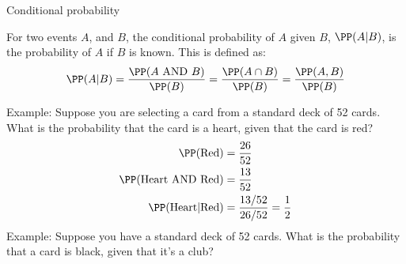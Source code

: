 \documentclass[compress, 8pt]{beamer}
\begin{document}
\begin{frame}{Conditional probability}

For two events $A$, and $B$, the conditional probability of $A$ given $B$, $\PP (A \vert B)$, is the probability of $A$ if $B$ is known. 
This is defined as:
\begin{equation*}
\PP (A \vert B) = \frac{\PP (A \text{ AND } B)}{\PP (B)} =  \frac{\PP (A \cap B)}{\PP (B)} = \frac{\PP (A, B)}{\PP (B)}
\end{equation*}

\vspace{2ex}


Example: Suppose you are selecting a card from a standard deck of 52 cards. What is the probability that the card is a heart, given that the card is red?
\begin{align*}
    \PP(\text{Red}) &= \frac{26}{52} \\
    \PP(\text{Heart AND Red}) &= \frac{13}{52} \\
    \PP(\text{Heart} \vert \text{Red}) &= \frac{13/52}{26/52} = \frac{1}{2} 
\end{align*}
Example: Suppose you have a standard deck of 52 cards. What is the probability that a card is black, given that it's a club? 


\end{frame}
\end{document}
